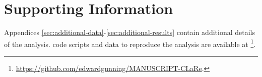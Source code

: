 \section*{Supporting Information}

Appendices \ref{sec:additional-data}-\ref{sec:additional-results} contain additional details of the analysis.
 code scripts and data to reproduce the analysis are available at \footnote{ \url{https://github.com/edwardgunning/MANUSCRIPT-CLaRe}.}.
